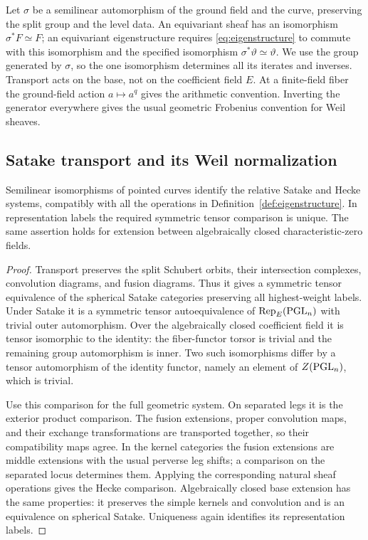 Let $\sigma$ be a semilinear automorphism of the ground field and the curve,
preserving the split group and the level data. An equivariant sheaf has an
isomorphism $\sigma^*F\simeq F$; an equivariant eigenstructure requires
\eqref{eq:eigenstructure} to commute with this isomorphism and the specified
isomorphism $\sigma^*\vartheta\simeq\vartheta$. We use the group generated
by $\sigma$, so the one isomorphism determines all its iterates and inverses.
Transport acts on the base, not on the coefficient field $E$.
At a finite-field fiber the ground-field action $a\mapsto a^q$ gives the
arithmetic convention. Inverting the generator everywhere gives the usual
geometric Frobenius convention for Weil sheaves.

\subsection{Satake transport and its Weil normalization}

\begin{lemma}\label{lem:satake-transport}
Semilinear isomorphisms of pointed curves identify the relative Satake and
Hecke systems, compatibly with all the operations in
Definition~\ref{def:eigenstructure}. In representation labels the required
symmetric tensor comparison is unique. The same assertion holds for
extension between algebraically closed characteristic-zero fields.
\end{lemma}

\begin{proof}
Transport preserves the split Schubert orbits, their intersection complexes,
convolution diagrams, and fusion diagrams. Thus it gives a symmetric tensor
equivalence of the spherical Satake categories preserving all highest-weight
labels. Under Satake it is a symmetric tensor autoequivalence of
$\operatorname{Rep}_E(\mathrm{PGL}_n)$ with trivial outer automorphism. Over the algebraically
closed coefficient field it is tensor isomorphic to the identity: the
fiber-functor torsor is trivial and the remaining group automorphism is inner.
Two such isomorphisms differ by a tensor automorphism of the identity functor,
namely an element of $Z(\mathrm{PGL}_n)$, which is trivial.

Use this comparison for the full geometric system. On separated legs it is
the exterior product comparison. The fusion extensions, proper convolution
maps, and their exchange transformations are transported together, so their
compatibility maps agree. In the kernel categories the fusion extensions
are middle extensions with the usual perverse leg shifts; a comparison on
the separated locus determines them. Applying the corresponding natural
sheaf operations gives the Hecke comparison. Algebraically closed base
extension has the same properties: it preserves the simple kernels and
convolution and is an equivalence on spherical Satake. Uniqueness again
identifies its representation labels.
\end{proof}

